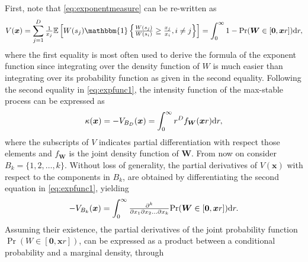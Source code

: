 \documentclass[lineno]{biometrika}
\begin{document}
First, note that \eqref{eq:exponentmeasure} can be re-written as
\begin{equation}\label{eq:expfunc1}
V(\bm x) = \sum_{j=1}^D \frac{1}{x_j} \mathbb E\left[W(s_j)\mathbbm{1}\left\{ \frac{W(s_j)}{W(s_i)} \geq \frac{x_j}{x_i},i\neq j \right\} \right] = \int_0^\infty 1 - \Pr(\bm W \in [\bm 0,\bm xr ])\text dr,
\end{equation}
where the first equality is most often used to derive the formula of the exponent function \citep{Wadsworth.Tawn:2014, Huser.Davison:2013a} since integrating over the density function of $W$ is much easier than integrating over its probability function as given in the second equality.
Following the second equality in \eqref{eq:expfunc1}, the intensity function of the max-stable process can be expressed as 
\begin{equation}\label{eq:intensity}
	\kappa(\bm x) = -V_{B_D}(\bm x) = \int_0^\infty r^D f_{\bm W}(\bm xr)\text dr,
\end{equation} 
where the subscripts of $V$ indicates partial differentiation with respect those elements and $f_{\bm W}$ is the joint density function of $\bm W$. From now on consider $B_k = \{1,2,\dots,k\}$. Without loss of generality, the partial derivatives of $V(\bm x)$ with respect to the components in $B_k$, are obtained
by differentiating the second equation in \eqref{eq:expfunc1}, yielding
\begin{equation}\label{eq:partialV_1}
 -V_{B_k}(\bm x) = \int_0^\infty {\textstyle{\partial^k\over\partial x_1\partial x_2\dots \partial x_k}}{\rm Pr}(\bm W \in [\bm 0,\bm xr ])\text dr. 
\end{equation}
Assuming their existence, the partial derivatives of the joint probability function $\Pr(W\in [\bm 0,\bm xr])$, can be expressed as a product between a conditional probability and a marginal density, through
\end{document}
